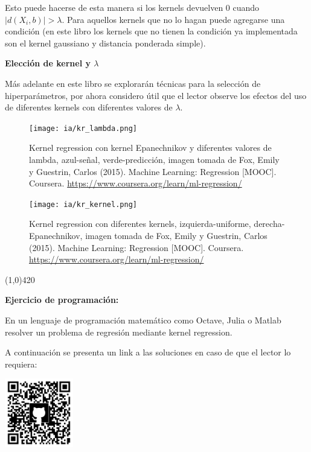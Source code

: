 \documentclass[11pt,fleqn]{book} %
\begin{document}
Esto puede hacerse de esta manera si los kernels devuelven 0 cuando $|d(X_i,b)| > \lambda$. Para aquellos kernels que no lo hagan puede agregarse una condición (en este libro los kernels que no tienen la condición ya implementada son el kernel gaussiano y distancia ponderada simple).

\textbf{Elección de kernel y $\lambda$}

Más adelante en este libro se explorarán técnicas para la selección de hiperparámetros, por ahora considero útil que el lector observe los efectos del uso de diferentes kernels con diferentes valores de $\lambda$.

\begin{figure}[ht]
\centering\texttt{[image: ia/kr\_lambda.png]}
\caption{Kernel regression con kernel Epanechnikov y diferentes valores de lambda, azul-señal, verde-predicción, imagen tomada de Fox, Emily y Guestrin, Carlos (2015). Machine Learning: Regression [MOOC]. Coursera. \url{https://www.coursera.org/learn/ml-regression/}}

\label{fig:kernel_regression_epanechikov} 
\end{figure}

\begin{figure}[ht]
\centering\texttt{[image: ia/kr\_kernel.png]}
\caption{Kernel regression con diferentes kernels, izquierda-uniforme, derecha-Epanechnikov, imagen tomada de Fox, Emily y Guestrin, Carlos (2015). Machine Learning: Regression [MOOC]. Coursera. \url{https://www.coursera.org/learn/ml-regression/}}

\label{fig:kernel_regression_diff_kernels} 
\end{figure}
\FloatBarrier

\begin{center}
\line(1,0){420}
\end{center}

\textbf{Ejercicio de programación:}

En un lenguaje de programación matemático como Octave, Julia o Matlab resolver un problema de regresión mediante kernel regression.

A continuación se presenta un link a las soluciones en caso de que el lector lo requiera:

\includegraphics[width=3cm]{Pictures/github/libro-ia.png}
\end{document}
